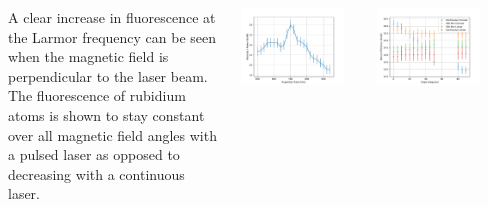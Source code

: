 \documentclass[
30pt,%
a1paper, 
landscape,%
margin = 0mm,
innermargin = -2cm,
colspace = 5mm,
subcolspace = 0mm,
blockverticalspace=.5cm %
]{tikzposter}
\begin{document}
\begin{columns}
	{
		A clear increase in fluorescence at the Larmor frequency can be seen when the magnetic field is perpendicular to the laser beam. The fluorescence of rubidium atoms is shown to stay constant over all magnetic field angles with a pulsed laser as opposed to decreasing with a continuous laser.\\
		\begin{minipage}{.15\textwidth}
			\begin{tikzfigure}[]
				\includegraphics[width=0.9\textwidth]{Images/FLvRep.pdf}
			\end{tikzfigure}
		\end{minipage}
		\begin{minipage}{.15\textwidth}
			\begin{tikzfigure}[]
			\includegraphics[width=0.9\textwidth]{../MRPData/April16/together.pdf}
		\end{tikzfigure}
		\end{minipage}
\\

}
\end{columns}
\end{document}
